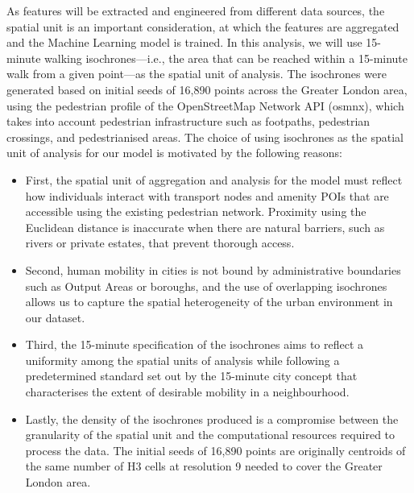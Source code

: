 As features will be extracted and engineered from different data sources, the spatial unit is an important consideration, at which the features are aggregated and the Machine Learning model is trained. In this analysis, we will use 15-minute walking isochrones---i.e., the area that can be reached within a 15-minute walk from a given point---as the spatial unit of analysis. The isochrones were generated based on initial seeds of 16,890 points across the Greater London area, using the pedestrian profile of the OpenStreetMap Network API (osmnx), which takes into account pedestrian infrastructure such as footpaths, pedestrian crossings, and pedestrianised areas. The choice of using isochrones as the spatial unit of analysis for our model is motivated by the following reasons: 

\begin{itemize}
    \setlength\itemsep{0em}
    \item First, the spatial unit of aggregation and analysis for the model must reflect how individuals interact with transport nodes and amenity POIs that are accessible using the existing pedestrian network. Proximity using the Euclidean distance is inaccurate when there are natural barriers, such as rivers or private estates, that prevent thorough access. 
    \item Second, human mobility in cities is not bound by administrative boundaries such as Output Areas or boroughs, and the use of overlapping isochrones allows us to capture the spatial heterogeneity of the urban environment in our dataset.
    \item Third, the 15-minute specification of the isochrones aims to reflect a uniformity among the spatial units of analysis while following a predetermined standard set out by the 15-minute city concept that characterises the extent of desirable mobility in a neighbourhood.
    \item Lastly, the density of the isochrones produced is a compromise between the granularity of the spatial unit and the computational resources required to process the data. The initial seeds of 16,890 points are originally centroids of the same number of H3 cells at resolution 9 needed to cover the Greater London area. 
\end{itemize}

